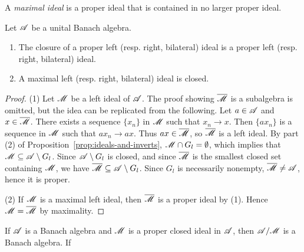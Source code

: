 \documentclass[reqno]{amsart}
\begin{document}
\begin{definition}
	A \emph{maximal ideal} is a proper ideal that is contained in no larger proper ideal.
\end{definition}

\begin{corollary}
	Let $\mathscr{A}$ be a unital Banach algebra.
	\mbox{}
	\begin{enumerate}[label = (\arabic*),itemsep=1pt,topsep=3pt]
		\item The closure of a proper left (resp. right, bilateral) ideal is a proper left (resp. right, bilateral) ideal.
		\item A maximal left (resp. right, bilateral) ideal is closed.
	\end{enumerate}
\end{corollary}
	\begin{proof}
		(1) Let $\mathscr{M}$ be a left ideal of $\mathscr{A}$. The proof showing $\overline{\mathscr{M}}$ is a subalgebra is omitted, but the idea can be replicated from the following. Let $a \in \mathscr{A}$ and $x \in \overline{\mathscr{M}}$. There exists a sequence $\{x_n\}$ in $\mathscr{M}$ such that $x_n \rightarrow x$. Then $\{a x_n\}$ is a sequence in $\mathscr{M}$ such that $a x_n \rightarrow ax$. Thus $ax \in \overline{\mathscr{M}}$, so $\overline{\mathscr{M}}$ is a left ideal. By part (2) of Proposition~\ref{prop:ideals-and-inverts}, $\mathscr{M} \cap G_l = \emptyset$, which implies that $\mathscr{M} \subseteq \mathscr{A} \setminus G_l$. Since $\mathscr{A} \setminus G_l$ is closed, and since $\overline{\mathscr{M}}$ is the smallest closed set containing $\mathscr{M}$, we have $\overline{\mathscr{M}} \subseteq \mathscr{A} \setminus G_l$. Since $G_l$ is necessarily nonempty, $\overline{\mathscr{M}} \neq \mathscr{A}$, hence it is proper.

		(2) If $\mathscr{M}$ is a maximal left ideal, then $\overline{\mathscr{M}}$ is a proper ideal by (1). Hence $\mathscr{M} = \overline{\mathscr{M}}$ by maximality.
	\end{proof}

\begin{proposition}
	If $\mathscr{A}$ is a Banach algebra and $\mathscr{M}$ is a proper closed ideal in $\mathscr{A}$, then $\mathscr{A} / \mathscr{M}$ is a Banach algebra. If 
\end{proposition}
\end{document}
